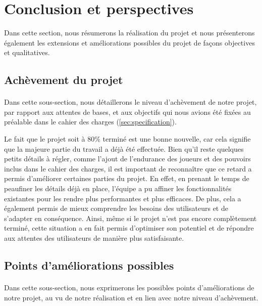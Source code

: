 \newpage
\section{Conclusion et perspectives}
\label{sec:conclusion}

\noindent Dans cette section, nous résumerons la réalisation du projet et nous présenterons également les extensions et améliorations possibles du projet de façons objectives et qualitatives. 

\subsection{Achèvement du projet}

\paragraph{}
    Dans cette sous-section, nous détaillerons le niveau d'achèvement de notre projet, par rapport aux attentes de bases, et aux objectifs qui nous avions été fixées au préalable dans le cahier des charges (\ref{sec:specification}).

    Le fait que le projet soit à 80\% terminé est une bonne nouvelle, car cela signifie que la majeure partie du travail a déjà été effectuée. Bien qu'il reste quelques petits détails à régler, comme l'ajout de l'endurance des joueurs et des pouvoirs inclus dans le cahier des charges, il est important de reconnaître que ce retard a permis d'améliorer certaines parties du projet. En effet, en prenant le temps de peaufiner les détails déjà en place, l'équipe a pu affiner les fonctionnalités existantes pour les rendre plus performantes et plus efficaces. De plus, cela a également permis de mieux comprendre les besoins des utilisateurs et de s'adapter en conséquence. Ainsi, même si le projet n'est pas encore complètement terminé, cette situation a en fait permis d'optimiser son potentiel et de répondre aux attentes des utilisateurs de manière plus satisfaisante.
    

\subsection{Points d'améliorations possibles}

\paragraph{}
    Dans cette sous-section, nous exprimerons les possibles points d'améliorations de notre projet, au vu de notre réalisation et en lien avec notre niveau d'achèvement.

